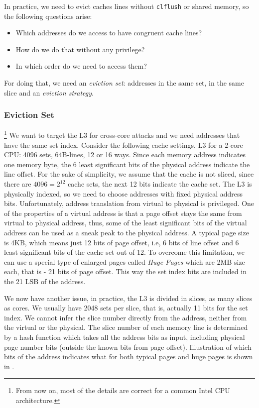 In practice, we need to evict caches lines without \texttt{clflush} or shared
memory, so the following questions arise:
\begin{itemize}
    \item Which addresses do we access to have congruent cache lines?
    \item How do we do that without any privilege?
    \item In which order do we need to access them?
\end{itemize}
For doing that, we need an \textit{eviction set}: addresses in the same set, in
the same slice and an \textit{eviction strategy}.

\subsubsection{Eviction Set}
\label{subsubsec:evictionset}
\footnote{From now on, most of the details are correct for a common Intel CPU architecture.}
We want to target the L3 for cross-core attacks and we need addresses that have
the same set index. Consider the following cache settings, L3 for a 2-core CPU:
4096 sets, 64B-lines, 12 or 16 ways. Since each memory address indicates one
memory byte, the 6 least significant bits of the physical address indicate the
line offset. For the sake of simplicity, we assume that the cache is not sliced,
since there are $4096=2^{12}$ cache sets, the next 12 bits indicate the cache
set. The L3 is physically indexed, so we need to choose addresses with fixed
physical address bits. Unfortunately, address translation from virtual to
physical is privileged. One of the properties of a virtual address is that a
page offset stays the same from virtual to physical address, thus, some of the
least significant bits of the virtual address can be used as a sneak peak to the
physical address. A typical page size is 4KB, which means just 12 bits of page
offset, i.e, 6 bits of line offset and 6 least significant bits of the cache set
out of 12. To overcome this limitation, we can use a special type of enlarged
pages called \textit{Huge Pages} which are 2MB size each, that is - 21 bits of
page offset. This way the set index bits are included in the 21 LSB of the
address.

We now have another issue, in practice, the L3 is divided in slices, as many
slices as cores. We usually have 2048 sets per slice, that is, actually 11 bits
for the set index. We cannot infer the slice number directly from the address,
neither from the virtual or the physical. The slice number of each memory line
is determined by a hash function which takes all the address bits as input,
including physical page number bits (outside the known bits from page offset).
Illustration of which bits of the address indicates what for both typical pages
and huge pages is shown in .

